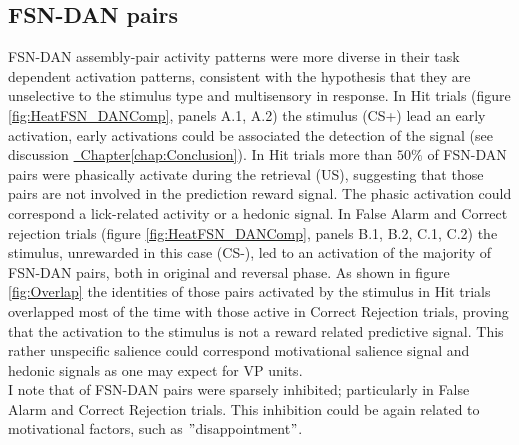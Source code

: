 \subsection{FSN-DAN pairs}
FSN-DAN assembly-pair activity patterns were more diverse in their task dependent activation patterns, consistent with the hypothesis that they are unselective to the stimulus type and multisensory in response. In Hit trials (figure \ref{fig:HeatFSN_DANComp}, panels A.1, A.2) the stimulus (CS+) lead an early activation, early activations could be associated the detection of the signal (see discussion \hyperref[chap:Conclusion]{~Chapter\ref*{chap:Conclusion}}). In Hit trials more than $50\%$ of FSN-DAN pairs were phasically activate during the retrieval (US), suggesting that those pairs are not involved in the prediction reward signal. The phasic activation could correspond a lick-related activity or a hedonic signal. In False Alarm and Correct rejection trials (figure \ref{fig:HeatFSN_DANComp}, panels B.1, B.2, C.1, C.2) the stimulus, unrewarded in this case (CS-), led to an activation of the majority of FSN-DAN pairs, both in original and reversal phase. As shown in figure \ref{fig:Overlap} the identities of those pairs activated by the stimulus in Hit trials overlapped most of the time with those active in Correct Rejection trials, proving that the activation to the stimulus is not a reward related predictive signal. This rather unspecific salience could correspond motivational salience signal and hedonic signals as one may expect for VP units.\\I note that of FSN-DAN pairs were sparsely inhibited; particularly in False Alarm and Correct Rejection trials. This inhibition could be again related to motivational factors, such as $"$disappointment$"$. 
